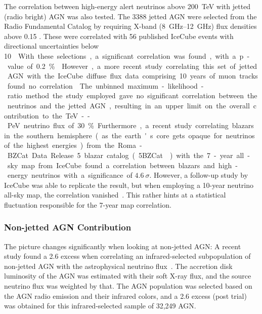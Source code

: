 The correlation between high-energy alert neutrinos above \SI{200}{\tera\eV} with jetted (radio bright) AGN was also tested. The 3388 jetted AGN were selected from the Radio Fundamental Catalog by requiring X-band (\SIrange{8}{12}{\giga\Hz}) flux densities above 0.15 \unit{\jansky}. These were correlated with 56 published IceCube events with directional uncertainties below \SI{10}{\square\deg}. With these selections, a significant correlation was found, with a p-value of \SI{0.2}{\percent}~.

However, a more recent study correlating this set of jetted AGN with the IceCube diffuse flux data comprising 10 years of muon tracks found no correlation~. The unbinned maximum-likelihood-ratio method the study employed gave no significant correlation between the neutrinos and the jetted AGN, resulting in an upper limit on the overall contribution to the \unit{\tera\eV}--\unit{\peta\eV} neutrino flux of \SI{30}{\percent}.

Furthermore, a recent study correlating blazars in the southern hemisphere (as the earth's core gets opaque for neutrinos of the highest energies) from the Roma-BZCat Data Release 5 blazar catalog (5BZCat~) with the 7-year all-sky map from IceCube found a correlation between blazars and high-energy neutrinos with a significance of $4.6~\sigma$. However, a follow-up study by IceCube was able to replicate the result, but when employing a 10-year neutrino all-sky map, the correlation vanished~. This rather hints at a statistical fluctuation responsible for the 7-year map correlation.

\subsubsection{Non-jetted AGN Contribution}

The picture changes significantly when looking at non-jetted AGN: A recent study found a \SI{2.6}{\sigma} excess when correlating an infrared-selected subpopulation of non-jetted AGN with the astrophysical neutrino flux~. The accretion disk luminosity of the AGN was estimated with their soft X-ray flux, and the source neutrino flux was weighted by that. The AGN population was selected based on the AGN radio emission and their infrared colors, and a \SI{2.6}{\sigma} excess (post trial) was obtained for this infrared-selected sample of 32,249 AGN.

